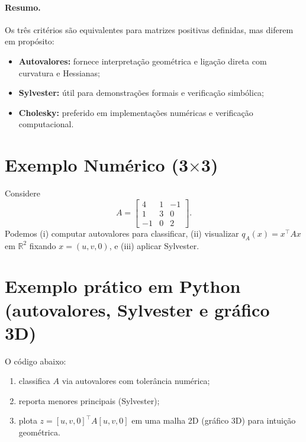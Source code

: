 \documentclass[9pt,a4paper]{extarticle}
\begin{document}
\paragraph{Resumo.}
Os tr\^es crit\'erios s\~ao equivalentes para matrizes positivas definidas, mas diferem em prop\'osito:
\begin{itemize}
  \item \textbf{Autovalores:} fornece interpreta\c c\~ao geom\'etrica e liga\c c\~ao direta com curvatura e Hessianas;
  \item \textbf{Sylvester:} \'util para demonstra\c c\~oes formais e verifica\c c\~ao simb\'olica;
  \item \textbf{Cholesky:} preferido em implementa\c c\~oes num\'ericas e verifica\c c\~ao computacional.
\end{itemize}


\section{Exemplo Num\'erico (3$\times$3)}
Considere
\[
A=\begin{bmatrix}
4 & 1 & -1\\
1 & 3 & 0\\
-1& 0 & 2
\end{bmatrix}.
\]
Podemos (i) computar autovalores para classificar, (ii) visualizar $q_A(x)=x^\top A x$ em $\mathbb{R}^2$ fixando $x=(u,v,0)$, e (iii) aplicar Sylvester.

\section{Exemplo pr\'atico em Python (autovalores, Sylvester e gr\'afico 3D)}
\noindent
O c\'odigo abaixo:
\begin{enumerate}
  \item classifica $A$ via autovalores com toler\^ancia num\'erica;
  \item reporta menores principais (Sylvester);
  \item plota $z = [u,v,0]^\top A [u,v,0]$ em uma malha 2D (gr\'afico 3D) para intui\c c\~ao geom\'etrica.
\end{enumerate}
\end{document}
